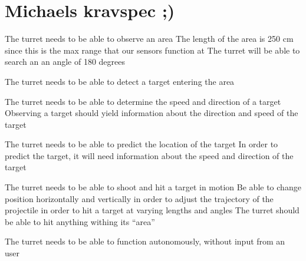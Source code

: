 \section{Michaels kravspec ;)}
The turret needs to be able to observe an area
The length of the area is 250 cm since this is the max range that our sensors function at
The turret will be able to search an an angle of 180 degrees

The turret needs to be able to detect a target entering the area

The turret needs to be able to determine the speed and direction of a target
Observing a target should yield information about the direction and speed of the target

The turret needs to be able to predict the location of the target
In order to predict the target, it will need information about the speed and direction of the target

The turret needs to be able to shoot and hit a target in motion
Be able to change position horizontally and vertically in order to adjust the trajectory of the projectile in order to hit a target at varying lengths and angles
The turret should be able to hit anything withing its “area”

The turret needs to be able to function autonomously, without input from an user
